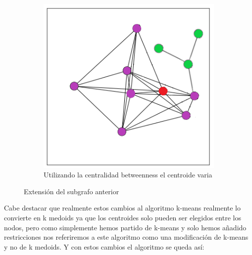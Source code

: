 \documentclass[12pt,a4paper]{article}
\begin{document}
\begin{figure}[H]
\begin{subfigure}{.5\textwidth}
  \includegraphics[width=.9\linewidth]{subgrafo nodos betweenness}
  \caption{Utilizando la centralidad betweenness el centroide varia}
  \label{fig:sub2}
\end{subfigure}
\caption{Extensión del subgrafo anterior}
\label{fig:test}
\end{figure}
			Cabe destacar que realmente estos cambios al algoritmo k-means realmente lo convierte en k medoids ya que los centroides solo pueden ser elegidos entre los nodos, pero como simplemente hemos partido de k-means y solo hemos añadido restricciones nos referiremos a este algoritmo como una modificación de k-means y no de k medoids. Y con estos cambios el algoritmo se queda así:\\
\end{document}
